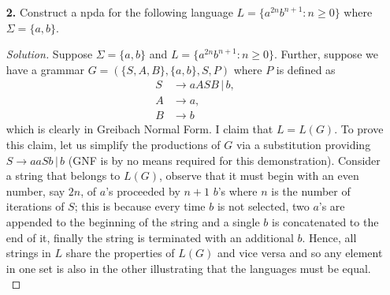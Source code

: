 \documentclass[ 12pt ]{article}
\begin{document}
\begin{enumerate}
\begin{proof}[Solution]
			To begin the process of converting our grammar to Chomsky Normal Form, notice that $S \to a$, $S \to d$, $A \to d$, and $B \to d$ are the only productions in CNF. Let's
			now introduce variables $X_a, X_b, X_{aa}, X_{ab}, X_{BB}$ into our grammar. With the following substitutions
			\begin{align*}
				S &\to a\, |\, d\, |\, X_bX_b\, |\, X_aA\, |\, X_bB\, |\, X_{ab}X_{BB}\, |\, \lambda, \\
				A &\to d\, |\, X_aX_a\, |\, X_bX_b\, |\, X_bX_B\, |\, X_{aa}A, \\
				B &\to d\, |\, X_bX_b\, |\, X_bX_B, \\
				X_{BB} &\to BB, \\
				X_{aa} &\to X_aX_a, \\
				X_{ab} &\to X_aX_b, \\
				X_a &\to a, \\
				X_b &\to b
			\end{align*}
			we can see that our modified grammar $G = (\{ S, A, B, X_a, X_b, X_{aa}, X_{ab}, X_{BB} \}, \{ a, b, d \}, S, P)$ is in CNF (with the exception of the $\lambda$-production
			from $S$ which is used to compensate for the removal of $\lambda$ in our grammar) and remains equivalent by Theorem 6.6.
		\end{proof}
		\newpage


	\item[\textbf{2.}] Construct a npda for the following language $L = \{ a^{2n} b^{n+1} : n \geq 0 \}$ where $\Sigma = \{ a, b \}$.

		\begin{proof}[Solution]
			Suppose $\Sigma = \{ a, b \}$ and $L = \{ a^{2n} b^{n+1} : n \geq 0 \}$. Further, suppose we have a grammar $G = (\{ S, A, B \}, \{ a, b \}, S, P)$ where $P$ is defined as
			\begin{align*}
				S &\to aASB\, |\, b, \\
				A &\to a, \\
				B &\to b
			\end{align*}
			which is clearly in Greibach Normal Form. I claim that $L = L(G)$. To prove this claim, let us simplify the productions of $G$ via a substitution providing $S \to aaSb\,
			|\, b$ (GNF is by no means required for this demonstration). Consider a string that belongs to $L(G)$, observe that it must begin with an even number, say $2n$, of $a$'s
			proceeded by $n + 1$ $b$'s where $n$ is the number of iterations of $S$; this is because every time $b$ is not selected, two $a$'s are appended to the beginning of the
			string and a single $b$ is concatenated to the end of it, finally the string is terminated with an additional $b$. Hence, all strings in $L$ share the properties of $L(G)$
			and vice versa and so any element in one set is also in the other illustrating that the languages must be equal. \\


\end{proof}
\end{enumerate}
\end{document}
